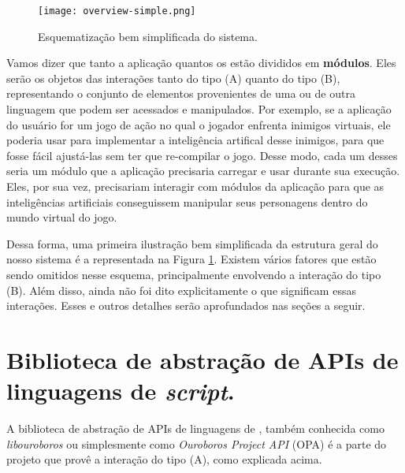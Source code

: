     \begin{figure}[ht]
      \centering
      \texttt{[image: overview-simple.png]}
      \caption{Esquematização bem simplificada do sistema.}
      \label{fig:overview-simple}
    \end{figure}

    Vamos dizer que tanto a aplicação quantos os  estão divididos
    em \textbf{módulos}. Eles serão os objetos das interações tanto do tipo (A)
    quanto do tipo (B), representando o conjunto de elementos provenientes de
    uma ou de outra linguagem que podem ser acessados e manipulados. Por
    exemplo, se a aplicação do usuário for um jogo de ação no qual o jogador
    enfrenta inimigos virtuais, ele poderia usar  para implementar a
    inteligência artifical desse inimigos, para que fosse fácil ajustá-las sem
    ter que re-compilar o jogo. Desse modo, cada um desses  seria um
    módulo que a aplicação precisaria carregar e usar durante sua execução.
    Eles, por sua vez, precisariam interagir com módulos da aplicação para que
    as inteligências artificiais conseguissem manipular seus personagens dentro
    do mundo virtual do jogo.

    Dessa forma, uma primeira ilustração bem simplificada da estrutura geral do
    nosso sistema é a representada na Figura \ref{fig:overview-simple}. Existem
    vários fatores que estão sendo omitidos nesse esquema, principalmente
    envolvendo a interação do tipo (B). Além disso, ainda não foi dito
    explicitamente o que significam essas interações. Esses e outros detalhes
    serão aprofundados nas seções a seguir.
    

  \section{Biblioteca de abstração de APIs de linguagens de \emph{script}.}
  \label{sec:estrutura:opa}
  

  A biblioteca de abstração de APIs de linguagens de \script{}, também conhecida como
  \textit{libouroboros} ou simplesmente como \emph{Ouroboros Project API} (OPA) é
  a parte do projeto que provê a interação do tipo (A), como explicada acima.
  
